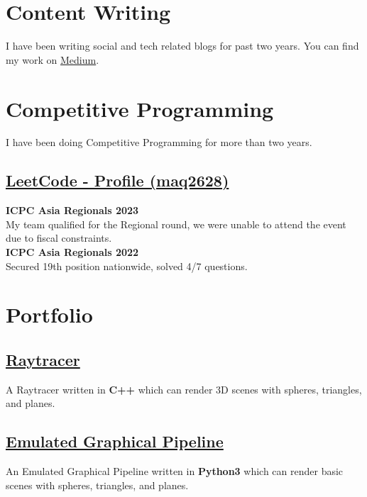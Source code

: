 \documentclass[]{resume}
\begin{document}
\begin{minipage}[t]{0.5\textwidth}

    \section{Content Writing}
    I have been writing social and tech related blogs for past two years. You can find my work on \href{https://medium.com/@mesumali26-ma}{Medium}.

    \section{Competitive Programming}
    I have been doing Competitive Programming for more than two years.\\
    \subsection{\href{https://leetcode.com/maq2628/}{\textbf{LeetCode - Profile (maq2628)}}}
    \textbf{ICPC Asia Regionals 2023}\\
    My team qualified for the Regional round, we were unable to attend the event due to fiscal constraints.\\
    \textbf{ICPC Asia Regionals 2022}\\
    Secured 19th position nationwide, solved 4/7 questions.


    \section{Portfolio}

    \subsection{\href{https://github.com/Qazalbash/Raytracer}{\textbf{Raytracer}}}%
    A Raytracer written in \textbf{C++} which can render 3D scenes with spheres, triangles, and planes.

    \subsection{\href{https://github.com/Qazalbash/Emulated-Graphical-Pipeline}{
            \textbf{Emulated Graphical Pipeline}}}%
    An Emulated Graphical Pipeline written in \textbf{Python3} which can render basic scenes with spheres, triangles, and planes.


\end{minipage}
\end{document}
